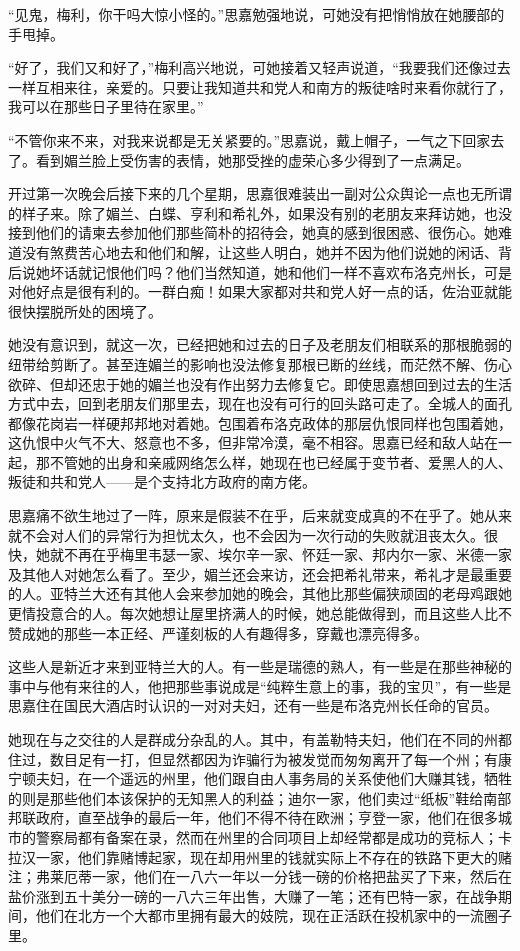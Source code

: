 \par “见鬼，梅利，你干吗大惊小怪的。”思嘉勉强地说，可她没有把悄悄放在她腰部的手甩掉。
\par “好了，我们又和好了，”梅利高兴地说，可她接着又轻声说道，“我要我们还像过去一样互相来往，亲爱的。只要让我知道共和党人和南方的叛徒啥时来看你就行了，我可以在那些日子里待在家里。”
\par “不管你来不来，对我来说都是无关紧要的。”思嘉说，戴上帽子，一气之下回家去了。看到媚兰脸上受伤害的表情，她那受挫的虚荣心多少得到了一点满足。
\par 开过第一次晚会后接下来的几个星期，思嘉很难装出一副对公众舆论一点也无所谓的样子来。除了媚兰、白蝶、亨利和希礼外，如果没有别的老朋友来拜访她，也没接到他们的请柬去参加他们那些简朴的招待会，她真的感到很困惑、很伤心。她难道没有煞费苦心地去和他们和解，让这些人明白，她并不因为他们说她的闲话、背后说她坏话就记恨他们吗？他们当然知道，她和他们一样不喜欢布洛克州长，可是对他好点是很有利的。一群白痴！如果大家都对共和党人好一点的话，佐治亚就能很快摆脱所处的困境了。
\par 她没有意识到，就这一次，已经把她和过去的日子及老朋友们相联系的那根脆弱的纽带给剪断了。甚至连媚兰的影响也没法修复那根已断的丝线，而茫然不解、伤心欲碎、但却还忠于她的媚兰也没有作出努力去修复它。即使思嘉想回到过去的生活方式中去，回到老朋友们那里去，现在也没有可行的回头路可走了。全城人的面孔都像花岗岩一样硬邦邦地对着她。包围着布洛克政体的那层仇恨同样也包围着她，这仇恨中火气不大、怒意也不多，但非常冷漠，毫不相容。思嘉已经和敌人站在一起，那不管她的出身和亲戚网络怎么样，她现在也已经属于变节者、爱黑人的人、叛徒和共和党人——是个支持北方政府的南方佬。
\par 思嘉痛不欲生地过了一阵，原来是假装不在乎，后来就变成真的不在乎了。她从来就不会对人们的异常行为担忧太久，也不会因为一次行动的失败就沮丧太久。很快，她就不再在乎梅里韦瑟一家、埃尔辛一家、怀廷一家、邦内尔一家、米德一家及其他人对她怎么看了。至少，媚兰还会来访，还会把希礼带来，希礼才是最重要的人。亚特兰大还有其他人会来参加她的晚会，其他比那些偏狭顽固的老母鸡跟她更情投意合的人。每次她想让屋里挤满人的时候，她总能做得到，而且这些人比不赞成她的那些一本正经、严谨刻板的人有趣得多，穿戴也漂亮得多。
\par 这些人是新近才来到亚特兰大的人。有一些是瑞德的熟人，有一些是在那些神秘的事中与他有来往的人，他把那些事说成是“纯粹生意上的事，我的宝贝”，有一些是思嘉住在国民大酒店时认识的一对对夫妇，还有一些是布洛克州长任命的官员。
\par 她现在与之交往的人是群成分杂乱的人。其中，有盖勒特夫妇，他们在不同的州都住过，数目足有一打，但显然都因为诈骗行为被发觉而匆匆离开了每一个州；有康宁顿夫妇，在一个遥远的州里，他们跟自由人事务局的关系使他们大赚其钱，牺牲的则是那些他们本该保护的无知黑人的利益；迪尔一家，他们卖过“纸板”鞋给南部邦联政府，直至战争的最后一年，他们不得不待在欧洲；亨登一家，他们在很多城市的警察局都有备案在录，然而在州里的合同项目上却经常都是成功的竞标人；卡拉汉一家，他们靠赌博起家，现在却用州里的钱就实际上不存在的铁路下更大的赌注；弗莱厄蒂一家，他们在一八六一年以一分钱一磅的价格把盐买了下来，然后在盐价涨到五十美分一磅的一八六三年出售，大赚了一笔；还有巴特一家，在战争期间，他们在北方一个大都市里拥有最大的妓院，现在正活跃在投机家中的一流圈子里。
